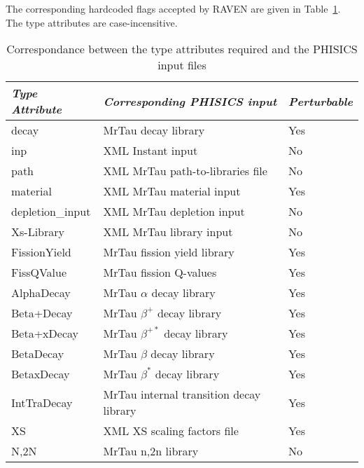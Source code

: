 The corresponding hardcoded flags accepted by RAVEN are given in Table~\ref{TypeTable}. The type attributes are case-incensitive.
\begin{table}[]
  \centering
  \caption{Correspondance between the type attributes required and the PHISICS input files}\label{TypeTable}
    \begin{tabular}{l|l|l}
\textit{Type Attribute} & \textit{Corresponding PHISICS input}                           & \textit{Perturbable} \\
\hline
decay                   & MrTau decay library                          & Yes                  \\
inp                     & XML Instant input                            & No                   \\
path                    & XML MrTau path-to-libraries file             & No                   \\
material                & XML MrTau material input                     & Yes                  \\
depletion\_input        & XML MrTau depletion input                    & No                   \\
Xs-Library              & XML MrTau library input                      & No                   \\
FissionYield            & MrTau fission yield library                  & Yes                  \\
FissQValue              & MrTau fission Q-values                       & Yes                  \\
AlphaDecay              & MrTau $\alpha$ decay library                 & Yes                  \\
Beta+Decay              & MrTau $\beta^+$ decay library                & Yes                  \\
Beta+xDecay             & MrTau $\beta^{+*}$ decay library             & Yes                  \\
BetaDecay               & MrTau $\beta$ decay library                  & Yes                  \\
BetaxDecay              & MrTau $\beta^*$ decay library                & Yes                  \\
IntTraDecay             & MrTau internal transition decay library      & Yes                  \\
XS                      & XML XS scaling factors file                  & Yes                  \\
N,2N                    & MrTau n,2n library                           & No                   \\

\end{tabular}
\end{table}
